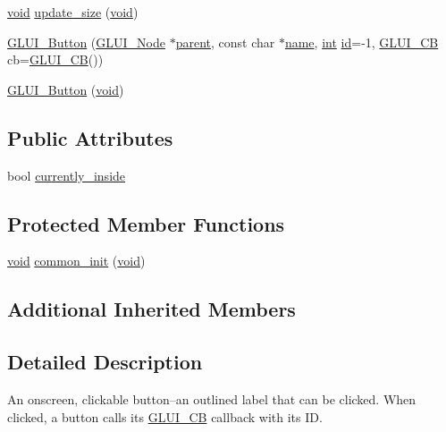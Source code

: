 \begin{DoxyCompactItemize}
\item 
\hyperlink{wglext_8h_a9e6b7f1933461ef318bb000d6bd13b83}{void} \hyperlink{class_g_l_u_i___button_a374f9334b7a026ba6e63d4911039d456}{update\+\_\+size} (\hyperlink{wglext_8h_a9e6b7f1933461ef318bb000d6bd13b83}{void})
\item 
\hyperlink{class_g_l_u_i___button_ab7ddf8c8d6c6c3dcab55b1738b1e7b8d}{G\+L\+U\+I\+\_\+\+Button} (\hyperlink{class_g_l_u_i___node}{G\+L\+U\+I\+\_\+\+Node} $\ast$\hyperlink{class_g_l_u_i___node_a8ed65d447784f6f88bd3e2e2bcac6cdb}{parent}, const char $\ast$\hyperlink{glext_8h_ad977737dfc9a274a62741b9500c49a32}{name}, \hyperlink{wglext_8h_a500a82aecba06f4550f6849b8099ca21}{int} \hyperlink{glext_8h_a58c2a664503e14ffb8f21012aabff3e9}{id}=-\/1, \hyperlink{class_g_l_u_i___c_b}{G\+L\+U\+I\+\_\+\+C\+B} cb=\hyperlink{class_g_l_u_i___c_b}{G\+L\+U\+I\+\_\+\+C\+B}())
\item 
\hyperlink{class_g_l_u_i___button_a801dc750129ae94d4aebacffe38086aa}{G\+L\+U\+I\+\_\+\+Button} (\hyperlink{wglext_8h_a9e6b7f1933461ef318bb000d6bd13b83}{void})
\end{DoxyCompactItemize}
\subsection*{Public Attributes}
\begin{DoxyCompactItemize}
\item 
bool \hyperlink{class_g_l_u_i___button_aa7267a5e210893367862d9d96888eb41}{currently\+\_\+inside}
\end{DoxyCompactItemize}
\subsection*{Protected Member Functions}
\begin{DoxyCompactItemize}
\item 
\hyperlink{wglext_8h_a9e6b7f1933461ef318bb000d6bd13b83}{void} \hyperlink{class_g_l_u_i___button_ac840fd31bb87ab5c4448f772759cf1b6}{common\+\_\+init} (\hyperlink{wglext_8h_a9e6b7f1933461ef318bb000d6bd13b83}{void})
\end{DoxyCompactItemize}
\subsection*{Additional Inherited Members}


\subsection{Detailed Description}
An onscreen, clickable button--an outlined label that can be clicked. When clicked, a button calls its \hyperlink{class_g_l_u_i___c_b}{G\+L\+U\+I\+\_\+\+C\+B} callback with its I\+D. 

